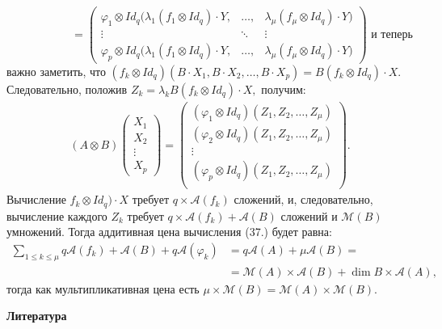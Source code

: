 \documentclass{../../template/mai_book}
\begin{document}
$\;\;\;\;\;\;\;\;\;\;\;\;\;\;\;\;\;\;\;\;\,= \begin{pmatrix}
\varphi_1 \otimes Id_q (\lambda_1 (f_1 \otimes Id_q) \cdot Y, & \dots , & \lambda_{\mu} (f_{\mu} \otimes Id_q) \cdot Y) \\
\vdots & \ddots & \vdots \\
\varphi_p \otimes Id_q (\lambda_1 (f_1 \otimes Id_q) \cdot Y, & \dots , & \lambda_{\mu} (f_{\mu} \otimes Id_q) \cdot Y)
\end{pmatrix}
$ \newline \newline \newline
и теперь важно заметить, что $(f_k \otimes Id_q)(B \cdot X_1 , B \cdot X_2 , \dots , B \cdot X_p) = B(f_k \otimes Id_q) \cdot X$. Следовательно, положив $Z_k = \lambda_k B(f_k \otimes Id_q) \cdot X,$ получим:
\begin{align}
(A \otimes B)\begin{pmatrix}
X_1 \\
X_2 \\
\vdots \\
X_p
\end{pmatrix} = \begin{pmatrix}
(\varphi_1 \otimes Id_q)(Z_1 , Z_2 , \dots , Z_{\mu})\\
(\varphi_2 \otimes Id_q)(Z_1 , Z_2 , \dots , Z_{\mu})\\
\vdots \\
(\varphi_p \otimes Id_q)(Z_1 , Z_2 , \dots , Z_{\mu})\\
\end{pmatrix} \tag{14}.
\end{align}
Вычисление $f_k \otimes Id_q) \cdot X$ требует $q \times \mathcal{A}(f_k)$ сложений, и, следовательно, вычисление каждого $Z_k$ требует $q \times \mathcal{A}(f_k) + \mathcal{A}(B)$ сложений и $\mathcal{M}(B)$ умножений. Тогда аддитивная цена вычисления (37.) будет равна: 
\begin{align*}
\sum \limits_{1 \le k \le \mu}q \mathcal{A}(f_k) + \mathcal{A}(B) + q \mathcal{A} (\varphi_k) &= q \mathcal{A}(A) + \mu \mathcal{A} (B) = \\
&= \mathcal{M}(A) \times \mathcal{A} (B) + \dim B \times \mathcal{A} (A),
\end{align*}
тогда как мультипликативная цена есть $\mu \times \mathcal{M} (B) = \mathcal{M} (A) \times \mathcal{M} (B).$
\newpage
\hfill \break
\hfill \break
\begin{center}
  {\huge \textbf{Литература}}
\end{center}
\end{document}
